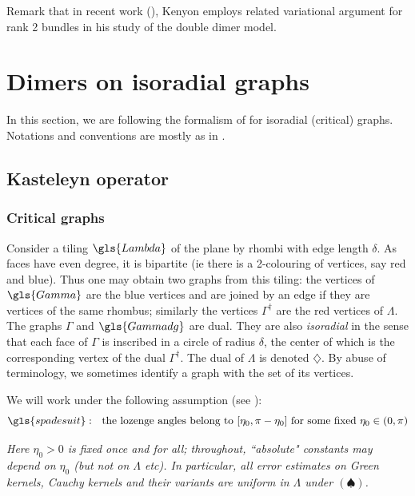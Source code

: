 \documentclass[10pt]{article}
\newcommand{\dg}{\dagger}
\newcommand{\dmd}{\diamondsuit}
\begin{document}
Remark that in recent work (\cite{Ken_double}), Kenyon employs related variational argument for rank 2 bundles in his study of the double dimer model.




\section{Dimers on isoradial graphs}

In this section, we are following the formalism of \cite{Duffin_rhombic,Mercat,Ken_isoradial,SmiChe_isoradial} for isoradial (critical) graphs. Notations and conventions are mostly as in \cite{SmiChe_isoradial}.

\subsection{Kasteleyn operator}

\subsubsection{Critical graphs}\label{sss:critgraphs}

Consider a tiling $\gls{Lambda}$ of the plane by rhombi with edge length $\delta$. As faces have even degree, it is bipartite (ie there is a 2-colouring of vertices, say red and blue). Thus one may obtain two graphs from this tiling: the vertices of $\gls{Gamma}$ are the blue vertices and are joined by an edge if they are vertices of the same rhombus; similarly the vertices $\Gamma^\dg$ are the red vertices of $\Lambda$. The graphs $\Gamma$ and $\gls{Gammadg}$ are dual. They are also {\em isoradial} in the sense that each face of $\Gamma$ is inscribed in a circle of radius $\delta$, the center of which is the corresponding vertex of the dual $\Gamma^\dg$. The dual of $\Lambda$ is denoted $\dmd$. By abuse of terminology, we sometimes identify a graph with the set of its vertices.

We will work under the following assumption (see \cite{SmiChe_isoradial}):
%
%
%
\begin{equation}\label{eq:spade}
\gls{spadesuit}:\textrm{\ \ the lozenge angles belong to }[\eta_0,\pi-\eta_0]\textrm{\ for some fixed\ }\eta_0\in (0,\pi)\end{equation}

{\em Here $\eta_0>0$ is fixed once and for all; throughout, ``absolute" constants may depend on $\eta_0$ (but not on $\Lambda$ etc). In particular, all error estimates on Green kernels, Cauchy kernels and their variants are uniform in $\Lambda$ under $(\spadesuit)$.}
\end{document}
